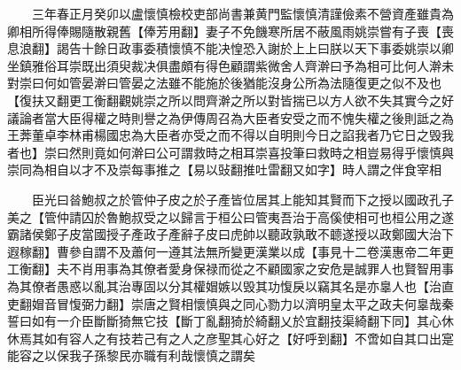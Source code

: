 　　三年春正月癸卯以盧懷慎檢校吏部尚書兼黄門監懷慎清謹儉素不營資產雖貴為卿相所得俸賜隨散親舊【俸芳用翻】妻子不免饑寒所居不蔽風雨姚崇嘗有子喪【喪息浪翻】謁告十餘日政事委積懷慎不能决惶恐入謝於上上曰朕以天下事委姚崇以卿坐鎮雅俗耳崇既出須臾裁决俱盡頗有得色顧謂紫微舍人齊澣曰予為相可比何人澣未對崇曰何如管晏澣曰管晏之法雖不能施於後猶能沒身公所為法隨復更之似不及也【復扶又翻更工衡翻觀姚崇之所以問齊澣之所以對皆揣已以方人欲不失其實今之好議論者當大臣得權之時則譽之為伊傳周召為大臣者安受之而不愧失權之後則詆之為王莾董卓李林甫楊國忠為大臣者亦受之而不得以自明則今日之諂我者乃它日之毁我者也】崇曰然則竟如何澣曰公可謂救時之相耳崇喜投筆曰救時之相豈易得乎懷慎與崇同為相自以才不及崇每事推之【易以䜴翻推吐雷翻又如字】時人謂之伴食宰相

　　臣光曰㫺鮑叔之於管仲子皮之於子產皆位居其上能知其賢而下之授以國政孔子美之【管仲請囚於魯鮑叔受之以歸言于桓公曰管夷吾治于高傒使相可也桓公用之遂霸諸侯鄭子皮當國授子產政子產辭子皮曰虎帥以聽政孰敢不聼遂授以政鄭國大治下遐稼翻】曹參自謂不及蕭何一遵其法無所變更漢業以成【事見十二卷漢惠帝二年更工衡翻】夫不肖用事為其僚者愛身保禄而從之不顧國家之安危是誠罪人也賢智用事為其僚者愚惑以亂其治專固以分其權媢嫉以毁其功愎戾以竊其名是亦辠人也【治直吏翻媢音冒愎弼力翻】崇唐之賢相懷慎與之同心勠力以濟明皇太平之政夫何辠哉秦誓曰如有一介臣斷斷猗無它技【斷丁亂翻猗於綺翻乂於宜翻技渠綺翻下同】其心休休焉其如有容人之有技若己有之人之彦聖其心好之【好呼到翻】不啻如自其口出寔能容之以保我子孫黎民亦職有利哉懷慎之謂矣

